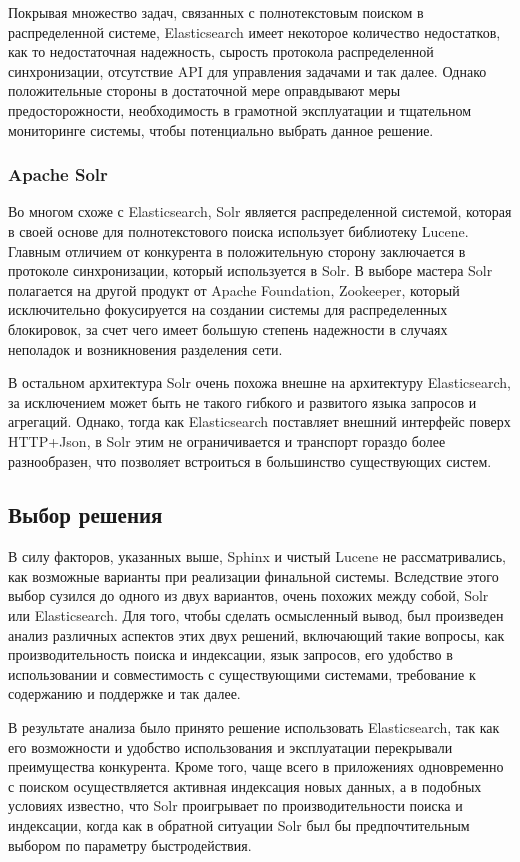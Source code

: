 Покрывая множество задач, связанных с полнотекстовым поиском в распределенной системе, Elasticsearch имеет некоторое количество недостатков, как то недостаточная надежность, сырость протокола распределенной синхронизации, отсутствие API для управления задачами и так далее. Однако положительные стороны в достаточной мере оправдывают меры предосторожности, необходимость в грамотной эксплуатации и тщательном мониторинге системы, чтобы потенциально выбрать данное решение.

\subsubsection{Apache Solr}

Во многом схоже с Elasticsearch, Solr является распределенной системой, которая в своей основе для полнотекстового поиска использует библиотеку Lucene. Главным отличием от конкурента в положительную сторону заключается в протоколе синхронизации, который используется в Solr. В выборе мастера Solr полагается на другой продукт от Apache Foundation, Zookeeper, который исключительно фокусируется на создании системы для распределенных блокировок, за счет чего имеет большую степень надежности в случаях неполадок и возникновения разделения сети.

В остальном архитектура Solr очень похожа внешне на архитектуру Elasticsearch, за исключением может быть не такого гибкого и развитого языка запросов и агрегаций. Однако, тогда как Elasticsearch поставляет внешний интерфейс поверх HTTP+Json, в Solr этим не ограничивается и транспорт гораздо более разнообразен, что позволяет встроиться в большинство существующих систем.

\subsection{Выбор решения}

В силу факторов, указанных выше, Sphinx и чистый Lucene не рассматривались, как возможные варианты при реализации финальной системы. Вследствие этого выбор сузился до одного из двух вариантов, очень похожих между собой, Solr или Elasticsearch. Для того, чтобы сделать осмысленный вывод, был произведен анализ различных аспектов этих двух решений, включающий такие вопросы, как производительность поиска и индексации, язык запросов, его удобство в использовании и совместимость с существующими системами, требование к содержанию и поддержке и так далее.

В результате анализа было принято решение использовать Elasticsearch, так как его возможности и удобство использования и эксплуатации перекрывали преимущества конкурента\cite{solr-vs-es-features}. Кроме того, чаще всего в приложениях одновременно с поиском осуществляется активная индексация новых данных, а в подобных условиях известно, что Solr проигрывает по производительности поиска и индексации\cite{solr-vs-es-perf-1}, когда как в обратной ситуации Solr был бы предпочтительным выбором по параметру быстродействия\cite{solr-vs-es-perf-2}.

\clearpage
